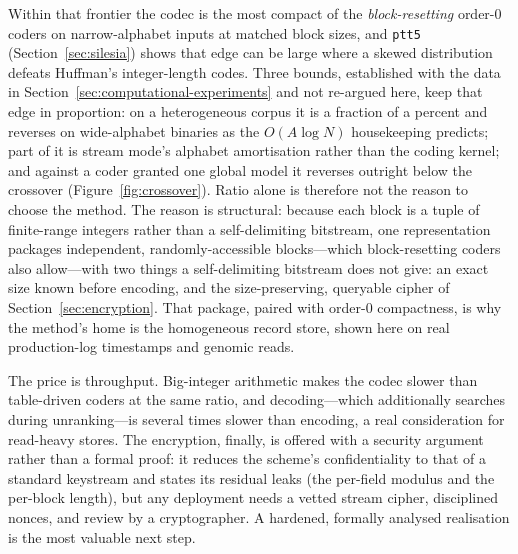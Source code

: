 \documentclass[entropy,article,submit,oneauthor,pdftex]{Definitions/mdpi}
\begin{document}
Within that frontier the codec is the most compact of the \emph{block-resetting} order-$0$
coders on narrow-alphabet inputs at matched block sizes, and \texttt{ptt5}
(Section~\ref{sec:silesia}) shows that edge can be large where a skewed distribution defeats
Huffman's integer-length codes. Three bounds, established with the data in
Section~\ref{sec:computational-experiments} and not re-argued here, keep that edge in
proportion: on a heterogeneous corpus it is a fraction of a percent and reverses on
wide-alphabet binaries as the $O(A\log N)$ housekeeping predicts; part of it is stream
mode's alphabet amortisation rather than the coding kernel; and against a coder granted one
global model it reverses outright below the crossover (Figure~\ref{fig:crossover}). Ratio
alone is therefore not the reason to choose the method. The reason is structural: because
each block is a tuple of finite-range integers rather than a self-delimiting bitstream, one
representation packages independent, randomly-accessible blocks---which block-resetting
coders also allow---with two things a self-delimiting bitstream does not give: an exact size
known before encoding, and the size-preserving, queryable cipher of
Section~\ref{sec:encryption}. That package, paired with order-$0$
compactness, is why the method's home is the homogeneous record store, shown here on real
production-log timestamps and genomic reads.

The price is throughput. Big-integer arithmetic makes the codec slower than
table-driven coders at the same ratio, and decoding---which additionally searches
during unranking---is several times slower than encoding, a real consideration for
read-heavy stores. The encryption, finally, is offered with a security argument
rather than a formal proof: it reduces the scheme's confidentiality to that of a
standard keystream and states its residual leaks (the per-field modulus and the
per-block length), but any deployment needs a vetted stream cipher, disciplined
nonces, and review by a cryptographer. A hardened, formally analysed realisation is
the most valuable next step.
\end{document}
